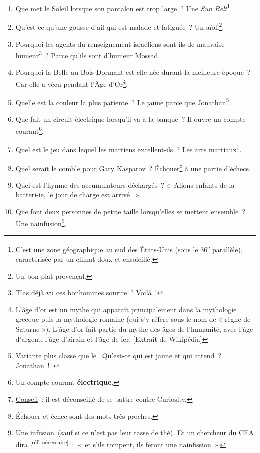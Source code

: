 \documentclass[10pt,a5paper,fullpage]{book}
\begin{document}
\begin{enumerate}
		\item Que met le Soleil lorsque son pantalon est trop large~? Une \textit{Sun Belt}\footnote{C'est une zone géographique au sud des États-Unis (sous le 36\textsuperscript{e} parallèle), caractérisée par un climat doux et ensoleillé.}.
		\item Qu’est-ce qu’une gousse d’ail qui est malade et fatiguée~? Un aïoli\footnote{Un bon plat provençal.}.
		\item Pourquoi les agents du renseignement israéliens sont-ils de mauvaise humeur\footnote{T'as déjà vu ces bonhommes sourire~? Voilà~!}~? Parce qu’ils sont d’humeur Mossad.
		\item Pourquoi la Belle au Bois Dormant est-elle née durant la meilleure époque~? Car elle a vécu pendant l’Âge d’Or\footnote{L’âge d'or est un mythe qui apparaît principalement dans la mythologie grecque puis la mythologie romaine (qui s'y réfère sous le nom de « règne de Saturne »). L’âge d'or fait partie du mythe des âges de l'humanité, avec l'âge d'argent, l'âge d'airain et l'âge de fer. [Extrait de Wikipédia]}.
		\item Quelle est la couleur la plus patiente~? Le jaune parce que Jonathan\footnote{Variante plus classe que le \guillemotleft~Qu'est-ce qui est jaune et qui attend~? Jonathan~!~\guillemotright}.
		\item Que fait un circuit électrique lorsqu’il va à la banque~? Il ouvre un compte courant\footnote{Un compte courant \textbf{électrique}.}.
		\item Quel est le jeu dans lequel les martiens excellent-ils~? Les arts martiaux\footnote{\underline{Conseil}~: il est déconseillé de se battre contre Curiosity.}.
		\item Quel serait le comble pour Gary Kasparov~? Échouer\footnote{Échouer et échec sont des mots très proches.} à une partie d'échecs. 
		\item Quel est l’hymne des accumulateurs déchargés~? « Allons enfants de la batteri-ie, le jour de charge est arrivé \textmusicalnote ».
		\item Que font deux personnes de petite taille lorsqu'elles se mettent ensemble~? Une nainfusion\footnote{Une infusion (sauf si ce n'est pas leur tasse de thé). Et un chercheur du CEA dira \textsuperscript{[réf. nécessaire]}~: «~et s’ils rompent, ils feront une nainfission~».}.

\end{enumerate}
\end{document}
